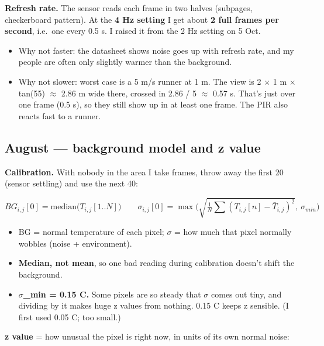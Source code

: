 \documentclass[11pt,a4paper]{article}
\providecommand{\tightlist}{\setlength{\itemsep}{0pt}\setlength{\parskip}{0pt}}
\begin{document}
\textbf{Refresh rate.} The
sensor reads each frame in two
halves (subpages, checkerboard
pattern). At the \textbf{4 Hz
setting} I get about \textbf{2
full frames per second},
i.e.~one every 0.5 s. I raised
it from the 2 Hz setting on 5
Oct.

\begin{itemize}
\tightlist
\item
  Why not faster: the
  datasheet shows noise goes
  up with refresh rate, and my
  people are often only
  slightly warmer than the
  background.
\item
  Why not slower: worst case
  is a 5 m/s runner at 1 m.
  The view is 2 $\times$ 1 m $\times$
  tan(55\textdegree{}) $\approx$ 2.86 m wide
  there, crossed in 2.86 / 5 $\approx$
  0.57 s. That's just over one
  frame (0.5 s), so they still
  show up in at least one
  frame. The PIR also reacts
  fast to a runner.
\end{itemize}

\hypertarget{august-background-model-and-z-value}{%
\subsection{August ---
background model and z
value}\label{august-background-model-and-z-value}}

\textbf{Calibration.} With
nobody in the area I take
frames, throw away the first
20 (sensor settling) and use
the next 40:

\[
BG_{i,j}[0] = \mathrm{median}\big(T_{i,j}[1..N]\big) \qquad \sigma_{i,j}[0] = \max\Big(\sqrt{\tfrac{1}{N}\textstyle\sum (T_{i,j}[n]-\bar T_{i,j})^2},\ \sigma_{min}\Big)
\]

\begin{itemize}
\tightlist
\item
  BG = normal temperature of
  each pixel; $\sigma$ = how much
  that pixel normally wobbles
  (noise + environment).
\item
  \textbf{Median, not mean},
  so one bad reading during
  calibration doesn't shift
  the background.
\item
  \textbf{$\sigma$\_min = 0.15 \textdegree{}C.}
  Some pixels are so steady
  that $\sigma$ comes out tiny, and
  dividing by it makes huge z
  values from nothing. 0.15 \textdegree{}C
  keeps z sensible. (I first
  used 0.05 \textdegree{}C; too small.)
\end{itemize}

\textbf{z value} = how unusual
the pixel is right now, in
units of its own normal noise:
\end{document}
